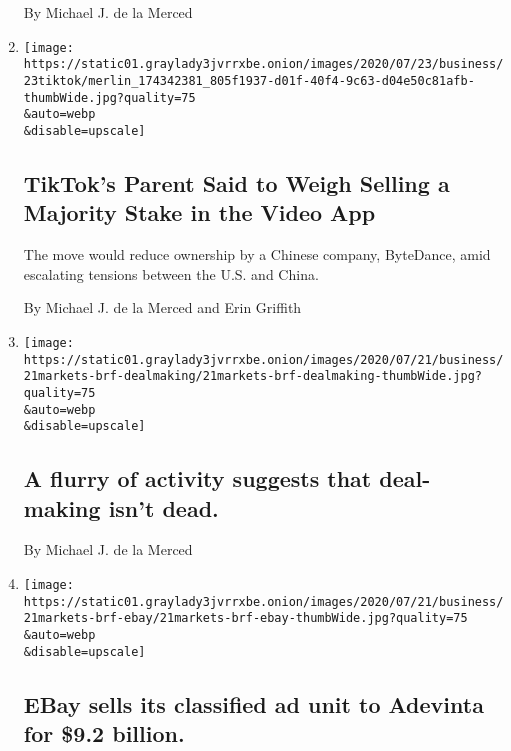 \begin{enumerate}
  By Michael J. de la Merced
\item
  \href{/2020/07/23/business/dealbook/tiktok-bytedance-investors-trump.html}{}

  \texttt{[image: https://static01.graylady3jvrrxbe.onion/images/2020/07/23/business/23tiktok/merlin\_174342381\_805f1937-d01f-40f4-9c63-d04e50c81afb-thumbWide.jpg?quality=75\\\&auto=webp\\\&disable=upscale]}

  \hypertarget{tiktoks-parent-said-to-weigh-selling-a-majority-stake-in-the-video-app}{%
  \subsection{TikTok's Parent Said to Weigh Selling a Majority Stake in
  the Video
  App}\label{tiktoks-parent-said-to-weigh-selling-a-majority-stake-in-the-video-app}}

  The move would reduce ownership by a Chinese company, ByteDance, amid
  escalating tensions between the U.S. and China.

  By Michael J. de la Merced and Erin Griffith
\item
  \href{/2020/07/21/business/a-flurry-of-activity-suggests-that-deal-making-isnt-dead.html}{}

  \texttt{[image: https://static01.graylady3jvrrxbe.onion/images/2020/07/21/business/21markets-brf-dealmaking/21markets-brf-dealmaking-thumbWide.jpg?quality=75\\\&auto=webp\\\&disable=upscale]}

  \hypertarget{a-flurry-of-activity-suggests-that-deal-making-isnt-dead}{%
  \subsection{A flurry of activity suggests that deal-making isn't
  dead.}\label{a-flurry-of-activity-suggests-that-deal-making-isnt-dead}}

  By Michael J. de la Merced
\item
  \href{/live/2020/07/21/business/stock-market-today-coronavirus/ebay-sells-its-classified-ad-unit-to-adevinta-for-9-2-billion}{}

  \texttt{[image: https://static01.graylady3jvrrxbe.onion/images/2020/07/21/business/21markets-brf-ebay/21markets-brf-ebay-thumbWide.jpg?quality=75\\\&auto=webp\\\&disable=upscale]}

  \hypertarget{ebay-sells-its-classified-ad-unit-to-adevinta-for-92-billion}{%
  \subsection{EBay sells its classified ad unit to Adevinta for \$9.2
  billion.}\label{ebay-sells-its-classified-ad-unit-to-adevinta-for-92-billion}}


\end{enumerate}
